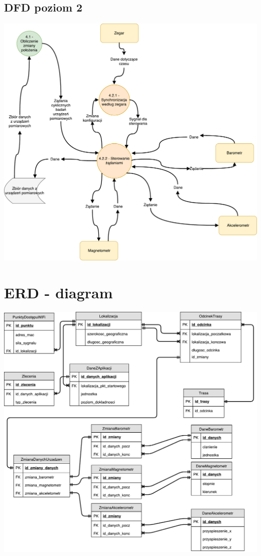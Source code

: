 \documentclass[11pt]{article}
\begin{document}
	\subsection{DFD poziom 2}
	\begin{center}
		\includegraphics[scale=0.55]{DFD42.pdf}
	\end{center}
	\newpage
	\section{ERD - diagram}
	\begin{center}
		\includegraphics[scale=0.65]{ERD.pdf}
	\end{center}
	\newpage
\end{document}
